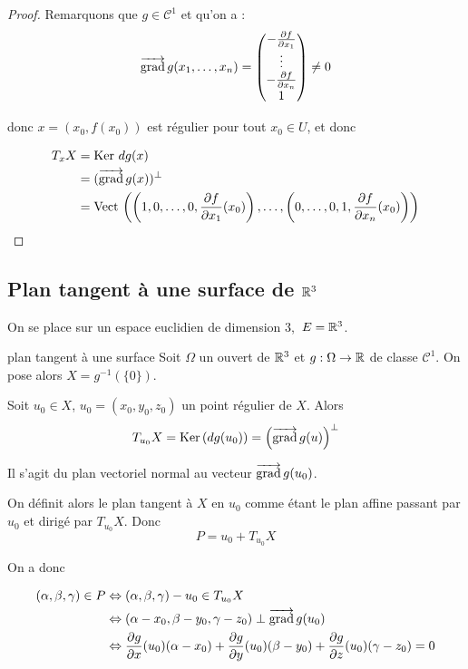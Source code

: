 \begin{proof}
    Remarquons que $g \in \mathscr C^1$ et qu'on a :
    $$\overrightarrow{\operatorname{grad}} \, g(x_1, \dots, x_n) = \begin{pmatrix}
        - \frac{\partial f}{\partial x_1} \\
        \vdots \\
        - \frac{\partial f}{\partial x_n} \\
        1
    \end{pmatrix} \neq 0$$

    donc $x = (x_0, f(x_0))$ est régulier pour tout $x_0 \in U$, et donc 

    \begin{align}
        T_xX & = \operatorname{Ker} \, dg(x) \\
        & = (\overrightarrow{\operatorname{grad}} \, g(x))^\perp \\
        & = \operatorname{Vect} \, \left( \left(1, 0, \ldots, 0, \frac{\partial f}{\partial x_1}(x_0) \right), \ldots, \left(0, \ldots, 0, 1, \frac{\partial f}{\partial x_n}(x_0) \right) \right) 
    \end{align}
\end{proof}


\subsection{Plan tangent à une surface de \texorpdfstring{$\mathbb{R}^3$}{R3}}

On se place sur un espace euclidien de dimension $3$, $\,E = \mathbb{R}^3$.


\begin{definition}{plan tangent à une surface}{}
    Soit $\Omega$ un ouvert de $\mathbb{R}^3$ et $g : \Omega \to \mathbb{R}$ de classe $\mathscr C^1$.
    On pose alors $X = g^{-1}(\{0\})$.

    Soit $u_0 \in X$, $u_0 = (x_0, y_0, z_0)$ un point régulier de $X$. Alors 
    $$T_{u_0}X = \operatorname{Ker} \,(dg(u_0)) = \left( \overrightarrow{\operatorname{grad}} \, g(u) \right)^\perp$$

    Il s'agit du plan vectoriel normal au vecteur $\overrightarrow{\operatorname{grad}} \, g(u_0)$.

    \avspace 

    On définit alors le plan tangent à $X$ en $u_0$ comme étant le plan affine passant par 
    $u_0$ et dirigé par $T_{u_0}X$. Donc 
    $$P = u_0 + T_{u_0}X$$
\end{definition}

On a donc 

\begin{align}
    (\alpha, \beta, \gamma) \in P & \Leftrightarrow (\alpha, \beta, \gamma) - u_0 \in T_{u_0}X \\
    & \Leftrightarrow (\alpha - x_0, \beta - y_0, \gamma - z_0) \perp \overrightarrow{\operatorname{grad}} \, g(u_0) \\
    & \Leftrightarrow \frac{\partial g}{\partial x}(u_0) (\alpha - x_0) + \frac{\partial g}{\partial y}(u_0) (\beta - y_0) + \frac{\partial g}{\partial z}(u_0) (\gamma - z_0) = 0
\end{align}


